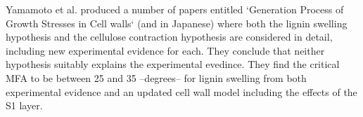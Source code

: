 Yamamoto et al. produced a number of papers entitled `Generation Process of
Growth Stresses in Cell walls` \cite{ISI:A1991FD97000001}\cite{ISI:A1992HP18200001}\cite{ISI:A1993LM28800002}\cite{ISI:A1993LE99600003}\cite{ISI:A1995QJ03000001} (and \cite{ISI:A1988R357800002}\cite{ISI:A1990EL71100002} in Japanese) where both the lignin swelling
hypothesis and the cellulose contraction hypothesis are considered in detail,
including new experimental evidence for each. They conclude that neither hypothesis suitably explains the experimental evedince. They find the critical MFA to be between 25 and 35 --degrees-- for lignin swelling from both experimental evidence and an updated cell wall model including the effects of the S1 layer. 